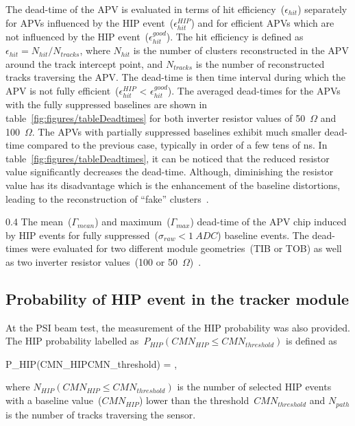 The dead-time of the APV is evaluated in terms of hit efficiency~($\epsilon_{hit}$) separately for APVs influenced by the HIP event~($\epsilon_{hit}^{HIP}$) and for efficient APVs which are not influenced by the HIP event~($\epsilon_{hit}^{good}$). The hit efficiency is defined as $\epsilon_{hit} = N_{hit}/N_{tracks}$, where $N_{hit}$ is the number of clusters reconstructed in the APV around the track intercept point, and $N_{tracks}$ is the number of reconstructed tracks traversing the APV. The dead-time is then time interval during which the APV is not fully efficient~($\epsilon_{hit}^{HIP}$ < $\epsilon_{hit}^{good}$). The averaged dead-times for the APVs with the fully suppressed baselines are shown in table~\ref{fig:figures/tableDeadtimes} for both inverter resistor values of 50~$\Omega$ and 100~$\Omega$. The APVs with partially suppressed baselines exhibit much smaller dead-time compared to the previous case, typically in order of a few tens of ns. In table~\ref{fig:figures/tableDeadtimes}, it can be noticed that the reduced resistor value significantly decreases the dead-time. Although, diminishing the resistor value has its disadvantage which is the enhancement of the baseline distortions, leading to the reconstruction of ``fake'' clusters~\cite{Bainbridge:2004jc}.

                 {0.4}       %
                 {The mean~($\Gamma_{mean}$) and maximum~($\Gamma_{max}$) dead-time of the APV chip induced by HIP events for fully suppressed~($\sigma_{raw}<1~ADC$) baseline events. The dead-times were evaluated for two different module geometries~(TIB or TOB) as well as two inverter resistor values~(100 or 50~$\Omega$)~\cite{Bainbridge:2004jc}.} %


\subsection{Probability of HIP event in the tracker module}

At the PSI beam test, the measurement of the HIP probability was also provided. The HIP probability labelled as~$P_{HIP}(CMN_{HIP}\leq CMN_{threshold})$ is defined as 

{
P_{HIP}(CMN_{HIP}\leq CMN_{threshold}) = ,
}

where $N_{HIP}(CMN_{HIP}\leq CMN_{threshold})$ is the number of selected HIP events with a baseline value~($CMN_{HIP}$) lower than the threshold~$CMN_{threshold}$ and $N_{path}$ is the number of tracks traversing the sensor.


